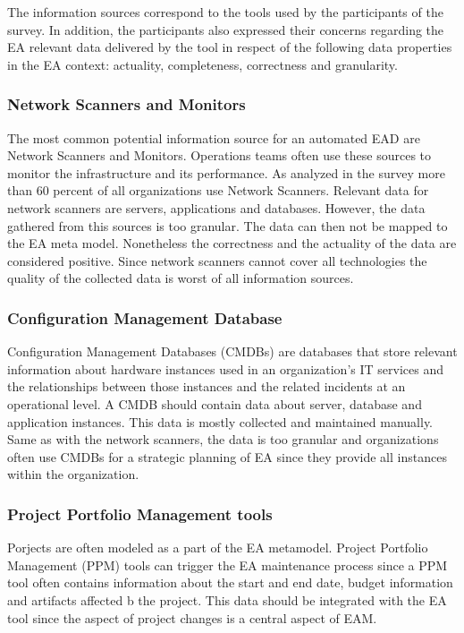 The information sources correspond to the tools used by the participants of the survey. In addition, the participants also expressed their concerns regarding the EA relevant data delivered by the tool in respect of the following data properties in the EA context: actuality, completeness, correctness and granularity. \cite{Farwick2013}

\subsubsection{Network Scanners and Monitors}
The most common potential information source for an automated EAD are Network Scanners and Monitors. Operations teams often use these sources to monitor the infrastructure and its performance. As analyzed in the survey more than 60 percent of all organizations use Network Scanners.
Relevant data for network scanners are servers, applications and databases. However, the data gathered from this sources is too granular. The data can then not be mapped to the EA meta model. Nonetheless the correctness and the actuality of the data are considered positive. Since network scanners cannot cover all technologies the quality  of the collected data is worst of all information sources.

\subsubsection{Configuration Management Database}
Configuration Management Databases (CMDBs) are databases that store relevant information about hardware instances used in an organization's IT services and the relationships between those instances and the related incidents at an operational level.
A CMDB should contain data about server, database and application instances. This data is mostly collected and maintained manually. Same as with the network scanners, the data is too granular and organizations often use CMDBs for a strategic planning of EA since they provide all instances within the organization. \cite{Farwick2013}

\subsubsection{Project Portfolio Management tools}
Porjects are often modeled as a part of the EA metamodel. Project Portfolio Management (PPM) tools can trigger the EA maintenance process since a PPM tool often contains information about the start and end date, budget information and artifacts affected b the project. This data should be integrated with the EA tool since the aspect of project changes is a central aspect of EAM.\cite{Farwick2013} 

